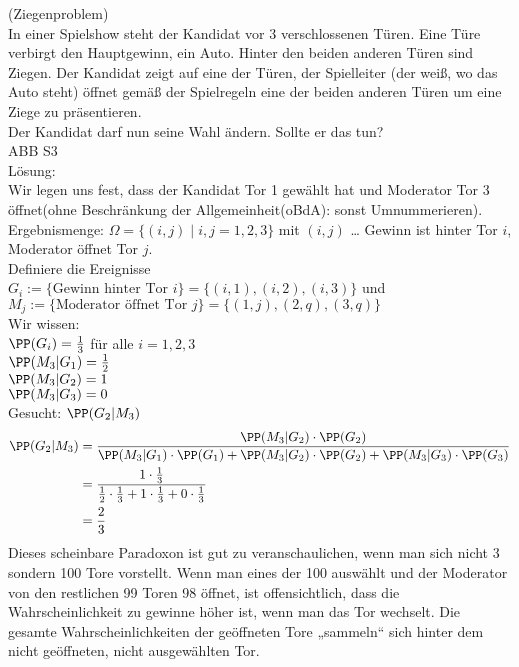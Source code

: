  (Ziegenproblem)\\
In einer Spielshow steht der Kandidat vor $3$ verschlossenen Türen. Eine Türe verbirgt den Hauptgewinn, ein Auto. Hinter den beiden anderen Türen sind Ziegen. Der Kandidat zeigt auf eine der Türen, der Spielleiter (der weiß, wo das Auto steht) öffnet gemäß der Spielregeln eine der beiden anderen Türen um eine Ziege zu präsentieren. \\
Der Kandidat darf nun seine Wahl ändern. Sollte er das tun?\\
ABB S3\\
Lösung: \\
Wir legen uns fest, dass der Kandidat Tor 1 gewählt hat und Moderator Tor 3 öffnet(ohne Beschränkung der Allgemeinheit(oBdA): sonst Umnummerieren).\\
Ergebnismenge: $\Omega = \{(i,j)\;|\; i,j=1,2,3\}$ mit $(i,j)$ … Gewinn ist hinter Tor $i$, Moderator öffnet Tor $j$.\\
Definiere die Ereignisse \\
$G_i:= \{ \text{Gewinn hinter Tor }i\}=\{(i,1), (i,2), (i,3)\}$ und\\
$M_j:=\{\text{Moderator öffnet Tor }j\}=\{(1,j), (2,q), (3,q)\}$\\
Wir wissen:\\
$\PP(G_i)=\frac{1}{3}$ für alle $i=1,2,3$\\
$\PP(M_3|G_1)=\tfrac{1}{2}$\\
$\PP(M_3|G_2)=1$\\
$\PP(M_3|G_3)=0$\\
Gesucht: $\PP(G_2|M_3)$
\begin{align*}
\PP(G_2|M_3)&=\frac{\PP(M_3|G_2)\cdot \PP(G_2)}{\PP(M_3|G_1)\cdot \PP(G_1)+\PP(M_3|G_2)\cdot \PP(G_2)+\PP(M_3|G_3)\cdot \PP(G_3)}\\
&=\frac{1\cdot \frac{1}{3}}{\frac{1}{2}\cdot \frac{1}{3}+1\cdot \frac{1}{3}+0\cdot \frac{1}{3}}\\
&=\frac{2}{3}
\end{align*}
Dieses scheinbare Paradoxon ist gut zu veranschaulichen, wenn man sich nicht 3 sondern 100 Tore vorstellt. Wenn man eines der 100 auswählt und der Moderator von den restlichen 99 Toren 98 öffnet, ist offensichtlich, dass die Wahrscheinlichkeit zu gewinne höher ist, wenn man das Tor wechselt. Die gesamte Wahrscheinlichkeiten der geöffneten Tore „sammeln“ sich hinter dem nicht geöffneten, nicht ausgewählten Tor.

